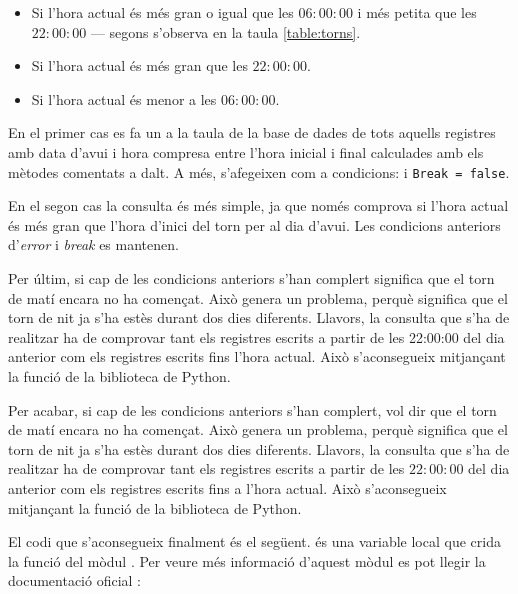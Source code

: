\documentclass{tfgitic}[2022/06/30]
\begin{document}
\begin{itemize}
    \item Si l'hora actual és més gran o igual que les $06:00:00$ i més petita que les $22:00:00$ --- segons s'observa en la taula \ref{table:torns}.
    \item Si l'hora actual és més gran que les $22:00:00$.
    \item Si l'hora actual és menor a les $06:00:00$.
\end{itemize}

En el primer cas es fa un  a la taula  de la base de dades de tots aquells registres amb data d'avui i hora compresa entre l'hora inicial i final calculades amb els mètodes comentats a dalt. A més, s'afegeixen com a condicions:  i \texttt{Break = false}.

En el segon cas la consulta és més simple, ja que només comprova si l'hora actual és més gran que l'hora d'inici del torn per al dia d'avui. Les condicions anteriors d'\emph{error} i \emph{break} es mantenen.

Per últim, si cap de les condicions anteriors s'han complert significa que el torn de matí encara no ha començat. Això genera un problema, perquè significa que el torn de nit ja s'ha estès durant dos dies diferents. Llavors, la consulta que s'ha de realitzar ha de comprovar tant els registres escrits a partir de les 22:00:00 del dia anterior com els registres escrits fins l'hora actual. Això s'aconsegueix mitjançant la funció  de la biblioteca  de Python.

Per acabar, si cap de les condicions anteriors s'han complert, vol dir que el torn de matí encara no ha començat. Això genera un problema, perquè significa que el torn de nit ja s'ha estès durant dos dies diferents. Llavors, la consulta que s'ha de realitzar ha de comprovar tant els registres escrits a partir de les $22:00:00$ del dia anterior com els registres escrits fins a l'hora actual. Això s'aconsegueix mitjançant la funció  de la biblioteca  de Python.

El codi que s'aconsegueix finalment és el següent.  és una variable local que crida la funció  del mòdul . Per veure més informació d'aquest mòdul es pot llegir la documentació oficial \cite{pythondoc:datetime}:
\end{document}
